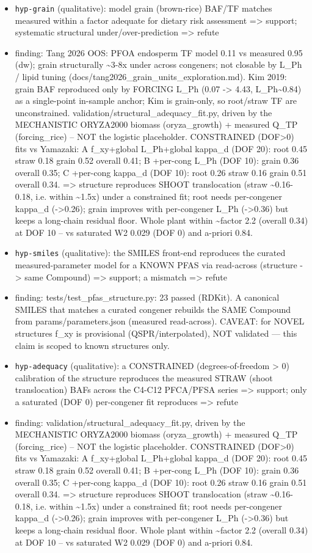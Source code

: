 \documentclass{article}
\begin{document}
\begin{itemize}
  \item \texttt{hyp-grain} (qualitative): model grain (brown-rice) BAF/TF matches measured within a factor adequate for dietary risk assessment => support; systematic structural under/over-prediction => refute
  \item finding: Tang 2026 OOS: PFOA endosperm TF model 0.11 vs measured 0.95 (dw); grain structurally \textasciitilde{}3-8x under across congeners; not closable by L\_Ph / lipid tuning (docs/tang2026\_grain\_units\_exploration.md).
Kim 2019: grain BAF reproduced only by FORCING L\_Ph (0.07 -> 4.43, L\_Ph\textasciitilde{}0.84) as a single-point in-sample anchor; Kim is grain-only, so root/straw TF are unconstrained.
validation/structural\_adequacy\_fit.py, driven by the MECHANISTIC ORYZA2000 biomass (oryza\_growth) + measured Q\_TP (forcing\_rice) -- NOT the logistic placeholder. CONSTRAINED (DOF>0) fits vs Yamazaki: A f\_xy+global L\_Ph+global kappa\_d (DOF 20): root 0.45 straw 0.18 grain 0.52 overall 0.41; B +per-cong L\_Ph (DOF 10): grain 0.36 overall 0.35; C +per-cong kappa\_d (DOF 10): root 0.26 straw 0.16 grain 0.51 overall 0.34. => structure reproduces SHOOT translocation (straw \textasciitilde{}0.16-0.18, i.e. within \textasciitilde{}1.5x) under a constrained fit; root needs per-congener kappa\_d (->0.26); grain improves with per-congener L\_Ph (->0.36) but keeps a long-chain residual floor. Whole plant within \textasciitilde{}factor 2.2 (overall 0.34) at DOF 10 -- vs saturated W2 0.029 (DOF 0) and a-priori 0.84.
  \item \texttt{hyp-smiles} (qualitative): the SMILES front-end reproduces the curated measured-parameter model for a KNOWN PFAS via read-across (structure -> same Compound) => support; a mismatch => refute
  \item finding: tests/test\_pfas\_structure.py: 23 passed (RDKit). A canonical SMILES that matches a curated congener rebuilds the SAME Compound from params/parameters.json (measured read-across). CAVEAT: for NOVEL structures f\_xy is provisional (QSPR/interpolated), NOT validated --- this claim is scoped to known structures only.
  \item \texttt{hyp-adequacy} (qualitative): a CONSTRAINED (degrees-of-freedom > 0) calibration of the structure reproduces the measured STRAW (shoot translocation) BAFs across the C4-C12 PFCA/PFSA series => support; only a saturated (DOF 0) per-congener fit reproduces => refute
  \item finding: validation/structural\_adequacy\_fit.py, driven by the MECHANISTIC ORYZA2000 biomass (oryza\_growth) + measured Q\_TP (forcing\_rice) -- NOT the logistic placeholder. CONSTRAINED (DOF>0) fits vs Yamazaki: A f\_xy+global L\_Ph+global kappa\_d (DOF 20): root 0.45 straw 0.18 grain 0.52 overall 0.41; B +per-cong L\_Ph (DOF 10): grain 0.36 overall 0.35; C +per-cong kappa\_d (DOF 10): root 0.26 straw 0.16 grain 0.51 overall 0.34. => structure reproduces SHOOT translocation (straw \textasciitilde{}0.16-0.18, i.e. within \textasciitilde{}1.5x) under a constrained fit; root needs per-congener kappa\_d (->0.26); grain improves with per-congener L\_Ph (->0.36) but keeps a long-chain residual floor. Whole plant within \textasciitilde{}factor 2.2 (overall 0.34) at DOF 10 -- vs saturated W2 0.029 (DOF 0) and a-priori 0.84.

\end{itemize}
\end{document}
